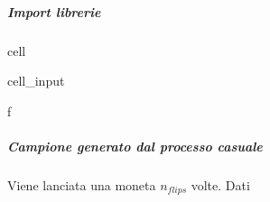 \documentclass[letterpaper,10pt,italian]{jupyterBook}
\begin{document}
\subparagraph{Import librerie}
\label{\detokenize{ch/statistics/test-fisher-coin-1:import-librerie}}
\begin{sphinxuseclass}{cell}\begin{sphinxVerbatimInput}

\begin{sphinxuseclass}{cell_input}
\begin{sphinxVerbatim}[commandchars=\\\{\}]
 \PYGZhy{}f
   
   

   
\end{sphinxVerbatim}

\end{sphinxuseclass}\end{sphinxVerbatimInput}

\end{sphinxuseclass}

\subparagraph{Campione generato dal processo casuale}
\label{\detokenize{ch/statistics/test-fisher-coin-1:campione-generato-dal-processo-casuale}}
\sphinxAtStartPar
Viene lanciata una moneta \(n_{flips}\) volte. Dati
\end{document}
